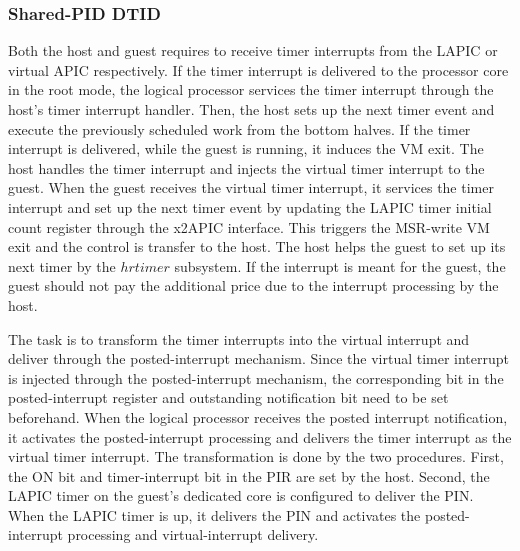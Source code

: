\subsubsection{Shared-PID DTID}
Both the host and guest requires to receive timer interrupts
from the LAPIC or virtual APIC respectively. If the timer
interrupt is delivered to the processor core in the root mode,
the logical processor services the timer interrupt through the
host's timer interrupt handler. Then, the host sets up the
next timer event and execute the previously scheduled work
from the bottom halves. If the timer interrupt is delivered,
while the guest is running, it induces the VM exit. The host
handles the timer interrupt and injects the virtual timer
interrupt to the guest. When the guest receives the virtual
timer interrupt, it services the timer interrupt and set up
the next timer event by updating the LAPIC timer initial count
register through the x2APIC interface. This triggers the
MSR-write VM exit and the control is transfer to the host. The
host helps the guest to set up its next timer by the $hrtimer$
subsystem. If the interrupt is meant for the guest, the guest
should not pay the additional price due to the interrupt
processing by the host.

The task is to transform the timer interrupts into the virtual
interrupt and deliver through the posted-interrupt mechanism.
Since the virtual timer interrupt is injected through the
posted-interrupt mechanism, the corresponding bit in the
posted-interrupt register and outstanding notification bit
need to be set beforehand. When the logical processor receives
the posted interrupt notification, it activates the
posted-interrupt processing and delivers the timer interrupt
as the virtual timer interrupt. The transformation is done by
the two procedures. First, the ON bit and timer-interrupt bit
in the PIR are set by the host. Second, the LAPIC timer on the
guest's dedicated core is configured to deliver the PIN. When
the LAPIC timer is up, it delivers the PIN and activates the
posted-interrupt processing and virtual-interrupt delivery.

